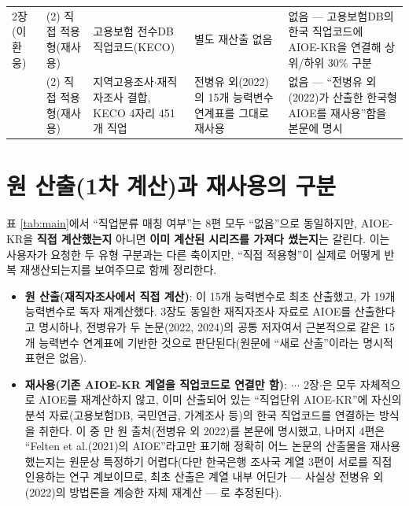 \documentclass[11pt]{article}
\begin{document}
\begin{longtable}{L{2.4cm}L{1.7cm}L{3.5cm}L{3.3cm}L{3.7cm}}
\citet{noh-2025-ai-labor-coexistence} 2장(이환웅) &
(2) 직접 적용형(재사용) &
고용보험 전수DB 직업코드(KECO) &
별도 재산출 없음 &
없음 --- 고용보험DB의 한국 직업코드에 AIOE-KR을 연결해 상위/하위 30\% 구분\\

\citet{cheon-2025-ai-exposure-vs-ai-adoption} &
(2) 직접 적용형(재사용) &
지역고용조사$\cdot$재직자조사 결합, KECO 4자리 451개 직업 &
전병유 외(2022)의 15개 능력변수 연계표를 그대로 재사용 &
없음 --- ``전병유 외(2022)가 산출한 한국형 AIOE를 재사용''함을 본문에 명시\\

\end{longtable}

\section{원 산출(1차 계산)과 재사용의 구분}

표 \ref{tab:main}에서 ``직업분류 매칭 여부''는 8편 모두 ``없음''으로 동일하지만, AIOE-KR을 \textbf{직접 계산했는지} 아니면 \textbf{이미 계산된 시리즈를 가져다 썼는지}는 갈린다. 이는 사용자가 요청한 두 유형 구분과는 다른 축이지만, ``직접 적용형''이 실제로 어떻게 반복 재생산되는지를 보여주므로 함께 정리한다.

\begin{itemize}
  \item \textbf{원 산출(재직자조사에서 직접 계산)}: \citet{cheon-2022-ai-employment-wage-effects}이 15개 능력변수로 최초 산출했고, \citet{kiet-2025-ai-occupational-employment-effect}가 19개 능력변수로 독자 재계산했다. \citet{chang-2024-ai-development-employment-effects} 3장도 동일한 재직자조사 자료로 AIOE를 산출한다고 명시하나, 전병유가 두 논문(2022, 2024)의 공통 저자여서 근본적으로 같은 15개 능력변수 연계표에 기반한 것으로 판단된다(원문에 ``새로 산출''이라는 명시적 표현은 없음).
  \item \textbf{재사용(기존 AIOE-KR 계열을 직업코드로 연결만 함)}: \citet{han-2025-ai-diffusion-youth-employment-decline}$\cdot$\citet{bok-2026-youth-employment-decline-ai-career-ladder}$\cdot$\citet{bok-2025-rapid-ai-diffusion-productivity-effects}$\cdot$\citet{noh-2025-ai-labor-coexistence} 2장$\cdot$\citet{cheon-2025-ai-exposure-vs-ai-adoption}은 모두 자체적으로 AIOE를 재계산하지 않고, 이미 산출되어 있는 ``직업단위 AIOE-KR''에 자신의 분석 자료(고용보험DB, 국민연금, 가계조사 등)의 한국 직업코드를 연결하는 방식을 취한다. 이 중 \citet{cheon-2025-ai-exposure-vs-ai-adoption}만 원 출처(전병유 외 2022)를 본문에 명시했고, 나머지 4편은 ``Felten et al.(2021)의 AIOE''라고만 표기해 정확히 어느 논문의 산출물을 재사용했는지는 원문상 특정하기 어렵다(다만 한국은행 조사국 계열 3편이 서로를 직접 인용하는 연구 계보이므로, 최초 산출은 계열 내부 어딘가 --- 사실상 전병유 외(2022)의 방법론을 계승한 자체 재계산 --- 로 추정된다).
\end{itemize}
\end{document}
